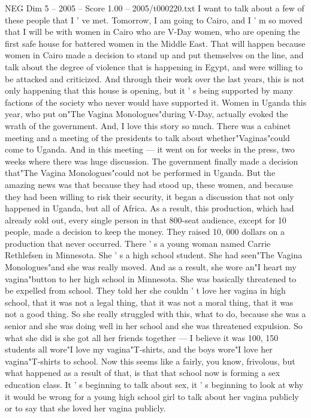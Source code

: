 \begin{textsample}{NEG Dim 5 – 2005 – Score 1.00 – 2005/t000220.txt}
I want to talk about a few of these people that I ' ve met.
Tomorrow, I am going to Cairo, and I ' m so moved that I will be with women in Cairo who are V-Day women, who are opening the first safe house for battered women in the Middle East.
That will happen because women in Cairo made a decision to stand up and put themselves on the line, and talk about the degree of violence that is happening in Egypt, and were willing to be attacked and criticized.
And through their work over the last years, this is not only happening that this house is opening, but it ' s being supported by many factions of the society who never would have supported it.
Women in Uganda this year, who put on"The Vagina Monologues"during V-Day, actually evoked the wrath of the government.
And, I love this story so much.
There was a cabinet meeting and a meeting of the presidents to talk about whether"Vaginas"could come to Uganda.
And in this meeting — it went on for weeks in the press, two weeks where there was huge discussion.
The government finally made a decision that"The Vagina Monologues"could not be performed in Uganda.
But the amazing news was that because they had stood up, these women, and because they had been willing to risk their security, it began a discussion that not only happened in Uganda, but all of Africa.
As a result, this production, which had already sold out, every single person in that 800-seat audience, except for 10 people, made a decision to keep the money.
They raised 10, 000 dollars on a production that never occurred.
There ' s a young woman named Carrie Rethlefsen in Minnesota.
She ' s a high school student.
She had seen"The Vagina Monologues"and she was really moved.
And as a result, she wore an"I heart my vagina"button to her high school in Minnesota.
She was basically threatened to be expelled from school.
They told her she couldn ' t love her vagina in high school, that it was not a legal thing, that it was not a moral thing, that it was not a good thing.
So she really struggled with this, what to do, because she was a senior and she was doing well in her school and she was threatened expulsion.
So what she did is she got all her friends together — I believe it was 100, 150 students all wore"I love my vagina"T-shirts, and the boys wore"I love her vagina"T-shirts to school.
Now this seems like a fairly, you know, frivolous, but what happened as a result of that, is that that school now is forming a sex education class.
It ' s beginning to talk about sex, it ' s beginning to look at why it would be wrong for a young high school girl to talk about her vagina publicly or to say that she loved her vagina publicly.

\end{textsample}

